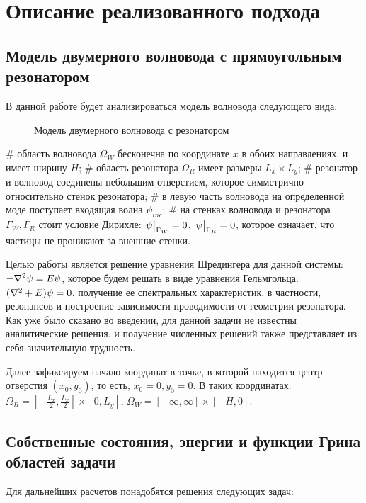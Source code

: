\chapter{Описание реализованного подхода}
\label{chapter2}

\section{Модель двумерного волновода с прямоугольным резонатором}
В данной работе будет анализироваться модель волновода следующего вида:
\begin{figure}[h!]
\begin{tikzpicture}[scale=0.7]

\end{tikzpicture}
\caption{Модель двумерного волновода с резонатором}
\end{figure}

\begin{ilist}
# область волновода $\Omega_W$ бесконечна по координате $x$ в обоих направлениях, и имеет ширину $H$;
# область резонатора $\Omega_R$ имеет размеры $L_x \times L_y$;
# резонатор и волновод соединены небольшим отверстием, которое симметрично относительно стенок резонатора;
# в левую часть волновода на определенной моде поступает входящая волна $\psi_{inc}$;
# на стенках волновода и резонатора $\Gamma_W, \Gamma_R$ стоит условие Дирихле: $\eval{\psi}_{\Gamma_W} = 0$, $\eval{\psi}_{\Gamma_R} = 0$, которое означает, что частицы не проникают за внешние стенки.
\end{ilist}

Целью работы является решение уравнения Шредингера для данной системы: $-\laplacian \psi = E \psi$, которое будем решать в виде уравнения Гельмгольца: $(\laplacian + E) \psi = 0$, получение ее спектральных характеристик, в частности, резонансов и построение зависимости проводимости от геометрии резонатора. Как уже было сказано во введении, для данной задачи не известны аналитические решения, и получение численных решений также представляет из себя значительную трудность.

Далее зафиксируем начало координат в точке, в которой находится центр отверстия $(x_0, y_0)$, то есть, $x_0 = 0, y_0 = 0$. В таких координатах: $\Omega_R = [- \frac{L_x}{2}, \frac{L_x}{2}] \times [0, L_y]$, $\Omega_W = [-\infty, \infty] \times [-H, 0]$.

\section{Собственные состояния, энергии и функции Грина областей задачи}
Для дальнейших расчетов понадобятся решения следующих задач:

